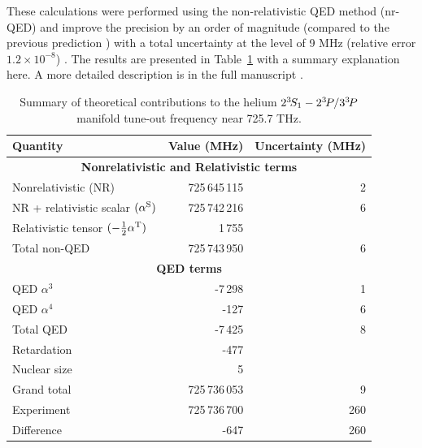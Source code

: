 	These calculations were performed using the non-relativistic QED method (nr-QED) and improve the precision by an order of magnitude (compared to the previous prediction \cite{Mitroy13}) with a total uncertainty at the level of 9 MHz (relative error $1.2\times10^{-8}$) . 
	The results are presented in Table~\ref{tab:theory} with a summary explanation here. A more detailed description is in the full manuscript \cite{Henson22}.
	
	\begin{table}[t]
	\centering
	\begin{tabular}{l r r}
	\hline\hline
	Quantity    &Value (MHz) & Uncertainty (MHz) \\
	\hline
	\multicolumn{3}{c}{\textbf{Nonrelativistic and Relativistic terms}} \\
	Nonrelativistic (NR) & 725\,645\,115& 2       \\
	NR + relativistic scalar $(\alpha^{\rm S})$    & 725\,742\,216&6   \\
	Relativistic tensor $(-\frac12\alpha^{\rm T})$ &   1\,755& \\
	\hline
	Total non-QED        & 725\,743\,950&6     \\
	\hline
	\multicolumn{3}{c}{\textbf{QED terms}} \\
	QED $\alpha^3$       &       -7\,298& 1       \\
	QED $\alpha^4$       &          -127& 6       \\
	\hline
	Total QED            &         -7\,425& 8     \\
	\hline
	Retardation          &          -477 &        \\
	Nuclear size         &             5&          \\
	\hline
	Grand total          & 725\,736\,053& 9       \\
	Experiment           & 725\,736\,700& 260 \\
	\hline
	Difference           &          -647& 260\\
	\hline\hline
	\end{tabular}\\
	\caption{\label{tab:theory}Summary of theoretical contributions to the helium $2^{3\!}S_1- 2^{3\!}P / 3^{3\!}P$ manifold tune-out frequency near 725.7 THz.}
	\label{tab:theory}
	\end{table}

